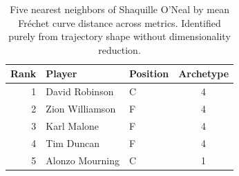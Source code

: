 \begin{table}[htbp]
  \centering\small
  \begin{tabular}{rllc}
    \toprule
    Rank & Player & Position & Archetype \\
    \midrule
    1 & David Robinson & C & 4 \\
    2 & Zion Williamson & F & 4 \\
    3 & Karl Malone & F & 4 \\
    4 & Tim Duncan & F & 4 \\
    5 & Alonzo Mourning & C & 1 \\
    \bottomrule
  \end{tabular}
  \caption{Five nearest neighbors of Shaquille O'Neal by mean Fr\'{e}chet curve distance across metrics. Identified purely from trajectory shape without dimensionality reduction.}
  \label{tab:Shaquille_O_Neal_frechet_curve_neighbors}
\end{table}

